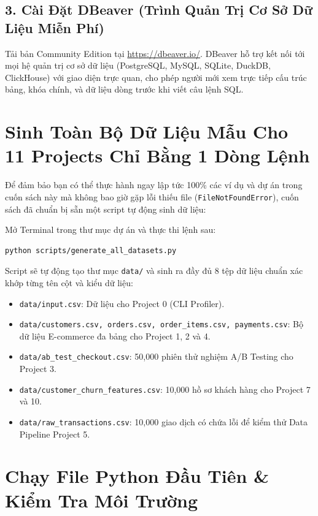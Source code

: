 \subsection{3. Cài Đặt DBeaver (Trình Quản Trị Cơ Sở Dữ Liệu Miễn Phí)}
Tải bản Community Edition tại \url{https://dbeaver.io/}. DBeaver hỗ trợ kết nối tới mọi hệ quản trị cơ sở dữ liệu (PostgreSQL, MySQL, SQLite, DuckDB, ClickHouse) với giao diện trực quan, cho phép người mới xem trực tiếp cấu trúc bảng, khóa chính, và dữ liệu dòng trước khi viết câu lệnh SQL.

\section{Sinh Toàn Bộ Dữ Liệu Mẫu Cho 11 Projects Chỉ Bằng 1 Dòng Lệnh}

Để đảm bảo bạn có thể thực hành ngay lập tức 100\% các ví dụ và dự án trong cuốn sách này mà không bao giờ gặp lỗi thiếu file (\texttt{FileNotFoundError}), cuốn sách đã chuẩn bị sẵn một script tự động sinh dữ liệu:

\begin{thuchanhbox}
Mở Terminal trong thư mục dự án và thực thi lệnh sau:
\begin{lstlisting}[language=bash]
python scripts/generate_all_datasets.py
\end{lstlisting}
Script sẽ tự động tạo thư mục \texttt{data/} và sinh ra đầy đủ 8 tệp dữ liệu chuẩn xác khớp từng tên cột và kiểu dữ liệu:
\begin{itemize}
    \item \texttt{data/input.csv}: Dữ liệu cho Project 0 (CLI Profiler).
    \item \texttt{data/customers.csv, orders.csv, order\_items.csv, payments.csv}: Bộ dữ liệu E-commerce đa bảng cho Project 1, 2 và 4.
    \item \texttt{data/ab\_test\_checkout.csv}: 50,000 phiên thử nghiệm A/B Testing cho Project 3.
    \item \texttt{data/customer\_churn\_features.csv}: 10,000 hồ sơ khách hàng cho Project 7 và 10.
    \item \texttt{data/raw\_transactions.csv}: 10,000 giao dịch có chứa lỗi để kiểm thử Data Pipeline Project 5.
\end{itemize}
\end{thuchanhbox}

\section{Chạy File Python Đầu Tiên \& Kiểm Tra Môi Trường}

